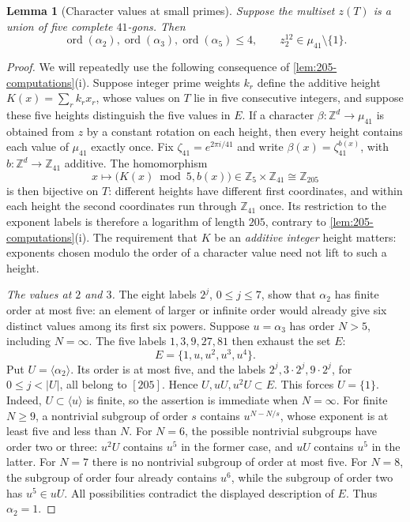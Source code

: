 \documentclass[11pt,reqno]{amsart}
\newcommand{\Z}{\mathbb Z}
\newtheorem{lemma}[theorem]{Lemma}
\theoremstyle{definition}
\theoremstyle{remark}
\numberwithin{equation}{section}
\begin{document}
\begin{lemma}[Character values at small primes]\label{lem:205-phases}
Suppose the multiset $z(T)$ is a union of five complete $41$-gons.
Then
\[
 \operatorname{ord}(\alpha_2),\operatorname{ord}(\alpha_3),
 \operatorname{ord}(\alpha_5)\le4,
 \qquad z_2^{12}\in\mu_{41}\setminus\{1\}.
\]
\end{lemma}

\begin{proof}
We will repeatedly use the following consequence of
\cref{lem:205-computations}(i).
Suppose integer prime weights $k_r$ define the additive height
$K(x)=\sum_r k_rx_r$, whose values on $T$ lie in five consecutive
integers, and suppose these five heights distinguish the five values in $E$.
If a character $\beta:\Z^d\to\mu_{41}$ is obtained from $z$ by a
constant rotation on each height, then every height contains
each value of $\mu_{41}$ exactly once. Fix
$\zeta_{41}=e^{2\pi i/41}$ and write
$\beta(x)=\zeta_{41}^{b(x)}$, with $b:\Z^d\to\Z_{41}$ additive.
The homomorphism
\begin{equation}\label{eq:205-height-logarithm}
 x\longmapsto \bigl(K(x)\bmod5,b(x)\bigr)
       \in\Z_5\times\Z_{41}\cong\Z_{205}
\end{equation}
is then bijective on $T$: different heights have different first
coordinates, and within each height the second coordinates run through
$\Z_{41}$ once. Its restriction to the exponent labels is therefore
a logarithm of length $205$, contrary to
\cref{lem:205-computations}(i). The requirement that $K$ be an
\emph{additive integer} height matters: exponents chosen modulo the
order of a character value need not lift to such a height.

\smallskip\noindent
\emph{The values at $2$ and $3$.}
The eight labels $2^j$, $0\le j\le7$, show that $\alpha_2$ has finite order
at most five: an element of larger or infinite order would already
give six distinct values among its first six powers.
Suppose $u=\alpha_3$ has order $N>5$, including $N=\infty$.
The five labels $1,3,9,27,81$ then exhaust the set $E$:
\[
 E=\{1,u,u^2,u^3,u^4\}.
\]
Put $U=\langle\alpha_2\rangle$. Its order is at most five, and
the labels $2^j,3\cdot2^j,9\cdot2^j$, for $0\le j<|U|$, all
belong to $[205]$. Hence $U,uU,u^2U\subset E$.
This forces $U=\{1\}$. Indeed, $U\subset\langle u\rangle$ is
finite, so the assertion is immediate when $N=\infty$. For finite
$N\ge9$, a nontrivial subgroup of order $s$ contains
$u^{N-N/s}$, whose exponent is at least five and less than $N$.
For $N=6$, the possible nontrivial subgroups have order two or three:
$u^2U$ contains $u^5$ in the former case, and $uU$ contains $u^5$
in the latter. For $N=7$ there is no nontrivial subgroup of order at
most five. For $N=8$, the subgroup of order four already contains
$u^6$, while the subgroup of order two has $u^5\in uU$.
All possibilities contradict the displayed description of $E$.
Thus $\alpha_2=1$.


\end{proof}
\end{document}
